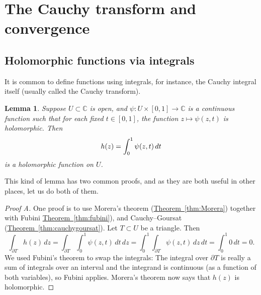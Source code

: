 \documentclass[12pt,openany]{book}
\newcommand{\avoidbreak}{\postdisplaypenalty=100}
\newcommand{\C}{{\mathbb{C}}}
\theoremstyle{plain}
\newtheorem{lemma}[thm]{Lemma}
\theoremstyle{remark}
\theoremstyle{definition}
\theoremstyle{exercise}
\theoremstyle{example}
\newcommand{\thmref}[1]{\hyperref[#1]{Theorem~\ref*{#1}}}
\begin{document}

\section{The Cauchy transform and convergence}

\subsection{Holomorphic functions via integrals}

It is common to define functions using integrals, for instance,
the Cauchy integral itself (usually called the Cauchy transform).

\begin{lemma} \label{lemma:holfuncbyintegral}
Suppose $U \subset \C$ is open, and
$\psi \colon U \times [0,1] \to \C$ is a continuous function such that
for each fixed $t \in [0,1]$, the function $z \mapsto \psi(z,t)$ is
holomorphic.  Then
\begin{equation*}
h(z) =
\int_0^1 \psi(z,t) \, dt
\avoidbreak
\end{equation*}
is a holomorphic function on $U$.
\end{lemma}

This kind of lemma has two common proofs,
and as they are both useful in other places, let us do both of them.

\begin{proof}[Proof A]
One proof is to use Morera's theorem (\thmref{thm:Morera})
together with Fubini \thmref{thm:fubini}), and Cauchy--Goursat
(\thmref{thm:cauchygoursat}).
Let $T \subset U$ be a triangle.  Then
\begin{equation*}
\int_{\partial T}
h(z)
\, dz
=
\int_{\partial T}
\int_0^1 \psi(z,t) \, dt
\, dz
=
\int_0^1
\int_{\partial T}
\psi(z,t)
\, dz
\, dt
= \int_0^1 0 \, dt = 0.
\end{equation*}
We used Fubini's theorem to swap the integrals:
The integral over $\partial T$ is really a sum of integrals over an interval
and the integrand is continuous (as a function of both variables), so Fubini applies.
Morera's theorem now says that $h(z)$ is
holomorphic.
\end{proof}
\end{document}
